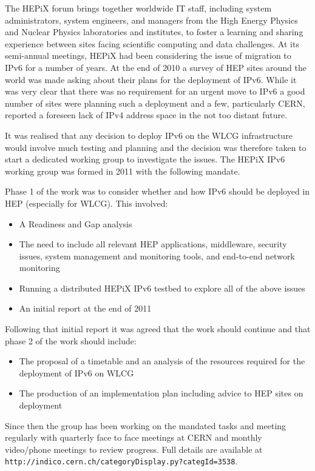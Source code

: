 The HEPiX forum brings together worldwide IT staff, including system administrators, system engineers, and managers from the High Energy Physics and Nuclear Physics laboratories and institutes, to foster a learning and sharing experience between sites facing scientific computing and data challenges. At its semi-annual meetings, HEPiX had been considering the issue of migration to IPv6 for a number of years. At the end of 2010 a survey of HEP sites around the world was made asking about their plans for the deployment of IPv6. While it was very clear that there was no requirement for an urgent move to IPv6 a good number of sites were planning such a deployment and a few, particularly CERN, reported a foreseen lack of IPv4 address space in the not too distant future.

It was realised that any decision to deploy IPv6 on the WLCG infrastructure would involve much testing and planning and the decision was therefore taken to start a dedicated working group to investigate the issues. The HEPiX IPv6 working group was formed in 2011 with the following mandate.

Phase 1 of the work was to consider whether and how IPv6 should be deployed in HEP (especially for WLCG). This involved:
\begin {itemize}
\item A Readiness and Gap analysis
\item The need to include all relevant HEP applications, middleware, security issues, system management and monitoring tools, and end-to-end network monitoring
\item Running a distributed HEPiX IPv6 testbed to explore all of the above issues
\item An initial report at the end of 2011
\end {itemize}	
Following that initial report it was agreed that the work should continue and that phase 2 of the work should include:
\begin {itemize}
\item The proposal of a timetable and an analysis of the resources required for the deployment of IPv6 on WLCG
\item The production of an implementation plan including advice to HEP sites on deployment
\end {itemize}

Since then the group has been working on the mandated tasks and meeting regularly with quarterly face to face meetings at CERN and monthly video/phone meetings to review progress. Full details are available at {\tt http://indico.cern.ch/categoryDisplay.py?categId=3538}.


